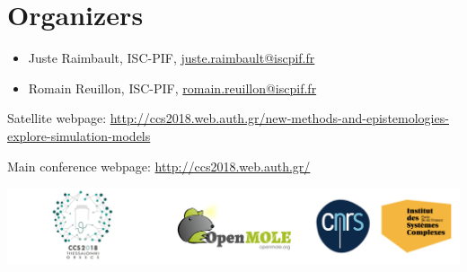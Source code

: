 \documentclass[11pt]{article}
\begin{document}
\section*{Organizers}

\begin{itemize}
	\item Juste Raimbault, ISC-PIF, \href{mailto:juste.raimbault@iscpif.fr}{juste.raimbault@iscpif.fr}
	\item Romain Reuillon, ISC-PIF, \href{mailto:romain.reuillon@iscpif.fr}{romain.reuillon@iscpif.fr}
\end{itemize}

\medskip

Satellite webpage: \href{http://ccs2018.web.auth.gr/new-methods-and-epistemologies-explore-simulation-models}{http://ccs2018.web.auth.gr/new-methods-and-epistemologies-explore-simulation-models}

\medskip

Main conference webpage: \href{http://ccs2018.web.auth.gr/}{http://ccs2018.web.auth.gr/}


\vspace{1cm}

\centering
\includegraphics[width=\linewidth]{logos.jpg}







%
%
\end{document}
